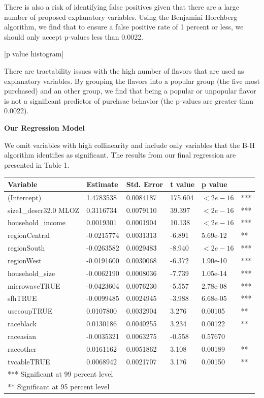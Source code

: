 \documentclass[11pt, fleqn]{article}
\begin{document}
There is also a risk of identifying false positives given that there are a large number of proposed explanatory variables. Using the Benjamini Horchberg algorithm, we find that to ensure a false positive rate of 1 percent or less, we should only accept p-values less than 0.0022.

[p value histogram]

There are tractability issues with the high number of flavors that are used as explanatory variables. By grouping the flavors into a popular group (the five most purchased) and an other group, we find that being a popular or unpopular flavor is not a significant predictor of purchsae behavior (the p-values are greater than 0.0022).

\textbf{Our Regression Model}

We omit variables with high collinearity and include only variables that the B-H algorithm identifies as significant. The results from our final regression are presented in Table 1.

\begin{tabular}{l l l l l l}
\toprule
  Variable            & Estimate  & Std. Error &  t value  & p value & \\ 
\midrule
(Intercept)           & 1.4783538 & 0.0084187 & 175.604 & $<2e-16$ & ***\\
size1\_descr32.0 MLOZ  & 0.3116734 & 0.0079110 & 39.397 & $<2e-16$ & *** \\
household\_income      & 0.0019301 & 0.0001904 & 10.138 & $<2e-16$ & *** \\
regionCentral         & -0.0215774 & 0.0031313 & -6.891 & 5.69e-12 & ** \\
regionSouth           & -0.0263582 & 0.0029483 & -8.940 & $<2e-16$ & *** \\
regionWest            & -0.0191600 & 0.0030068 & -6.372 & 1.90e-10 & *** \\
household\_size        & -0.0062190 & 0.0008036 & -7.739 & 1.05e-14 & *** \\
microwaveTRUE         & -0.0423604 & 0.0076230 & -5.557 & 2.78e-08 & *** \\
sfhTRUE               & -0.0099485 & 0.0024945 & -3.988 & 6.68e-05 & *** \\
usecoupTRUE           & 0.0107800 & 0.0032904 & 3.276 & 0.00105 & **  \\
raceblack             & 0.0130186 & 0.0040255 & 3.234 & 0.00122 & **  \\
raceasian             & -0.0035321 & 0.0063275 & -0.558 & 0.57670 & \\
raceother             & 0.0161162 & 0.0051862 & 3.108 & 0.00189 & **  \\
tvcableTRUE           & 0.0068942 & 0.0021707 & 3.176 & 0.00150 & **  \\
\midrule
\multicolumn{6}{l}{*** Significant at 99 percent level}\\
\multicolumn{6}{l}{** Significant at 95 percent level}\\
\bottomrule
\end{tabular}
\end{document}
